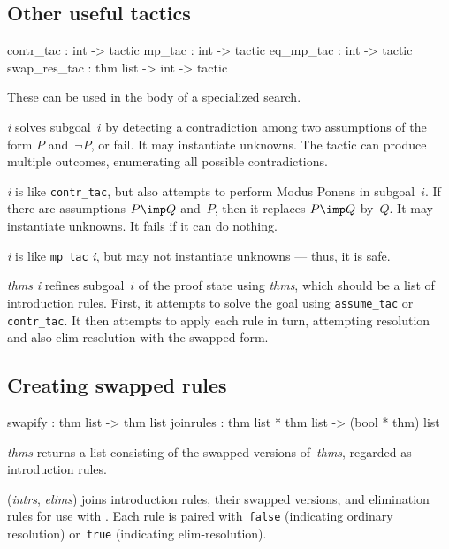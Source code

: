 \subsection{Other useful tactics}
\begin{ttbox} 
contr_tac    :             int -> tactic
mp_tac       :             int -> tactic
eq_mp_tac    :             int -> tactic
swap_res_tac : thm list -> int -> tactic
\end{ttbox}
These can be used in the body of a specialized search.
\begin{ttdescription}
\item[\ttindexbold{contr_tac} {\it i}]
  solves subgoal~$i$ by detecting a contradiction among two assumptions of
  the form $P$ and~$\neg P$, or fail.  It may instantiate unknowns.  The
  tactic can produce multiple outcomes, enumerating all possible
  contradictions.

\item[\ttindexbold{mp_tac} {\it i}] 
is like {\tt contr_tac}, but also attempts to perform Modus Ponens in
subgoal~$i$.  If there are assumptions $P\imp Q$ and~$P$, then it replaces
$P\imp Q$ by~$Q$.  It may instantiate unknowns.  It fails if it can do
nothing.

\item[\ttindexbold{eq_mp_tac} {\it i}] 
is like {\tt mp_tac} {\it i}, but may not instantiate unknowns --- thus, it
is safe.

\item[\ttindexbold{swap_res_tac} {\it thms} {\it i}] refines subgoal~$i$ of
the proof state using {\it thms}, which should be a list of introduction
rules.  First, it attempts to solve the goal using {\tt assume_tac} or
{\tt contr_tac}.  It then attempts to apply each rule in turn, attempting
resolution and also elim-resolution with the swapped form.
\end{ttdescription}

\subsection{Creating swapped rules}
\begin{ttbox} 
swapify   : thm list -> thm list
joinrules : thm list * thm list -> (bool * thm) list
\end{ttbox}
\begin{ttdescription}
\item[\ttindexbold{swapify} {\it thms}] returns a list consisting of the
swapped versions of~{\it thms}, regarded as introduction rules.

\item[\ttindexbold{joinrules} ({\it intrs}, {\it elims})]
joins introduction rules, their swapped versions, and elimination rules for
use with .  Each rule is paired with~{\tt false}
(indicating ordinary resolution) or~{\tt true} (indicating
elim-resolution).
\end{ttdescription}


